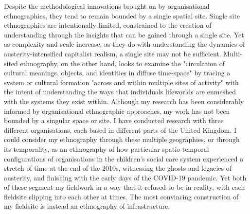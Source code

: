 Despite the methodological innovations brought on by organisational ethnographies, they tend to remain bounded by a single spatial site. Single site ethnographies are intentionally limited, constrained to the creation of understanding through the insights that can be gained through a single site. Yet as complexity and scale increase, as they do with understanding the dynamics of austerity-intensified capitalist realism, a single site may not be sufficient. Multi-sited ethnography, on the other hand, looks to examine the "circulation of cultural meanings, objects, and identities in diffuse time-space" \citep[97]{marcus_ethnography_1995} by tracing a system or cultural formation "across and within multiple sites of activity" with the intent of understanding the ways that individuals lifeworlds are enmeshed with the systems they exist within. Although my research has been considerably informed by organisational ethnographic approaches, my work has not been bounded by a singular space or site. I have conducted research with three different organisations, each based in different parts of the United Kingdom. I could consider my ethnography through these multiple geographies, or through its temporality, as an ethnography of how particular spatio-temporal configurations of organisations in the children's social care system experienced a stretch of time at the end of the 2010s, witnessing the ghosts and legacies of austerity, and finishing with the early days of the COVID-19 pandemic. Yet both of these segment my fieldwork in a way that it refused to be in reality, with each fieldsite slipping into each other at times. The most convincing construction of my fieldsite is instead an ethnography of infrastructure. 

